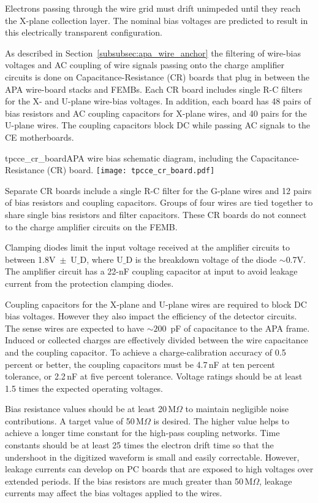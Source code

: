 Electrons passing through the wire grid must drift unimpeded until they reach the X-plane 
collection layer. The nominal bias voltages are predicted to result in this electrically 
transparent configuration.

As described in Section~\ref{subsubsec:apa_wire_anchor}
 the filtering of wire-bias voltages and AC coupling of wire signals passing
onto the charge amplifier circuits is done on Capacitance-Resistance (CR) boards that plug in between the APA wire-board stacks and FEMBs.
Each CR board includes single R-C filters for the X- and U-plane wire-bias voltages. In addition, each board has 48 
pairs of bias resistors and AC coupling capacitors for X-plane wires, and 40 pairs for the U-plane wires. The coupling capacitors block DC while passing AC 
signals to the CE motherboards.

\begin{cdrfigure}{tpcce_cr_board}{APA wire bias 
schematic diagram, including the Capacitance-Resistance (CR) board.}
\texttt{[image: tpcce\_cr\_board.pdf]}
\end{cdrfigure}

Separate CR boards include a single R-C filter for the G-plane wires and 12 pairs of bias resistors and
coupling capacitors.
Groups of four wires are tied together to share single
bias resistors and filter capacitors. These CR boards do not connect to the charge amplifier circuits on the FEMB.

Clamping diodes limit the input voltage received at the amplifier circuits to between 1.8V~$\pm$~U$\_$D, where U$\_$D
is the breakdown voltage of the diode $\sim$0.7V.
The amplifier circuit has a 22-nF coupling capacitor at input to avoid leakage current from the protection clamping diodes. 

Coupling capacitors for the X-plane and U-plane wires are required to block DC bias voltages.
However they also impact the efficiency of the detector circuits.
The sense wires are expected to have $\sim200$~pF of capacitance to the APA frame.
Induced or collected charges are effectively divided between the wire capacitance and the coupling capacitor.
To achieve a charge-calibration accuracy of 0.5 percent or better,
the coupling capacitors must be 4.7\,nF at ten percent tolerance, or 2.2\,nF at five percent tolerance.
Voltage ratings should be at least 1.5 times the expected operating voltages.

Bias resistance values should be at least 20\,M$\Omega$ to maintain negligible noise contributions.
A target value of 50\,M$\Omega$ is desired.
The higher value helps to achieve a longer time constant for the high-pass coupling networks.
Time constants should be at least 25 times the electron drift time so that the undershoot in the digitized waveform
is small and easily correctable.
However, leakage currents can develop on PC boards that are exposed to high voltages over extended periods.
If the bias resistors are much greater than 50\,M$\Omega$, leakage currents may affect the bias voltages applied to the wires.


